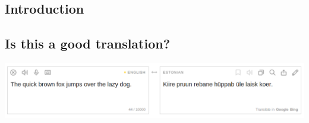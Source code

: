\documentclass[a0,portrait]{a0poster}
\begin{document}
\vspace{1cm} %


\begin{multicols}{2} %


%
%
%


\color{Black}
\section*{Introduction}

\subsection*{Is this a good translation?}
\begin{center}\vspace{1cm}
	\includegraphics[width=0.99\linewidth]{figures/screenshot2}
\end{center}



\end{multicols}
\end{document}
